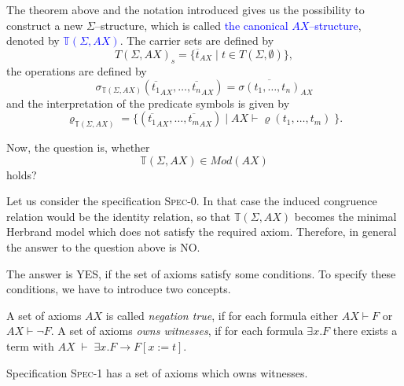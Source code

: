 \documentclass[landscape, autoslides, light]{mmiss}
\newcommand{\ns}{\normalsize}
\begin{document}
\begin{Package}[Label={FSDPT}, Title={Formal Specification of Data and Process Types}, ShortTitle={FSDPT}, Authors={Horst Reichel}, Date={February 2003}, LevelOfDetail=Lecture, Language=en-GB]
\begin{Section}[Title={Initial Algebras as Data Types}, Label={section3}]
\begin{Section}[Title={Existence of initial models}, Label={section3_1}]
\begin{Paragraph}[Label=Paragraph33]
\end{Paragraph}
\begin{Paragraph}[Title={Canonical Structure}, Label=Paragraph34]
 The theorem above and the notation introduced gives us
the possibility to construct a new $\Sigma$--structure, which is
called \textcolor{blue}{the canonical $AX$--structure}, denoted by
\textcolor{blue}{$\mathbb{T}(\Sigma,AX)$}. The carrier sets are
defined by
$$T(\Sigma,AX)_s = \{ \overline{t}_{AX} \; | \; t \in T(\Sigma,
\emptyset) \},$$ the operations are defined by $$
\sigma_{\mathbb{T}(\Sigma,AX)}( \overline{t_1}_{AX}, \ldots ,
\overline{t_n}_{AX}) = \overline{ \sigma (t_1, \ldots ,
t_n)}_{AX}$$
 and the interpretation of the predicate symbols is given by
$$ \varrho_{\mathbb{T}(\Sigma,AX)} =  \{ (\overline{t_1}_{AX},
\ldots , \overline{t_m}_{AX} ) \; | \; AX \vdash \varrho (t_1,
\ldots , t_m) \; \}.$$


\end{Paragraph}
\begin{Paragraph}[Label=Paragraph35]
\ns
 Now, the question is, whether $$ \mathbb{T}(\Sigma,AX) \in
Mod(AX)$$ holds?

Let us consider the specification \textsc{Spec-0}. In that case
the induced congruence relation would be the identity relation, so
that $ \mathbb{T}(\Sigma,AX)$ becomes the minimal Herbrand model
which does not satisfy the required axiom. Therefore, in general
the answer to the question above is NO.


\end{Paragraph}
\begin{Paragraph}[Label=Paragraph36]

\small
The answer is YES, if the set of axioms satisfy some  conditions.
To specify these conditions, we have to introduce two concepts.
\begin{List}[ListType=enumerate]
  \ListItem A set of axioms $AX$ is called \emph{negation true}, if for
  each formula either $AX \vdash F$ or $AX \vdash \neg F$.
  \ListItem A set of axioms \emph{owns witnesses}, if for each formula
  $\exists x . F$ there exists a term with
  $AX \; \vdash \; \exists x . F \rightarrow F[x := t]$.
\end{List}
Specification \textsc{Spec-1} has a set of axioms  which owns
witnesses.




\end{Paragraph}
\end{Section}
\end{Section}
\end{Package}
\end{document}
